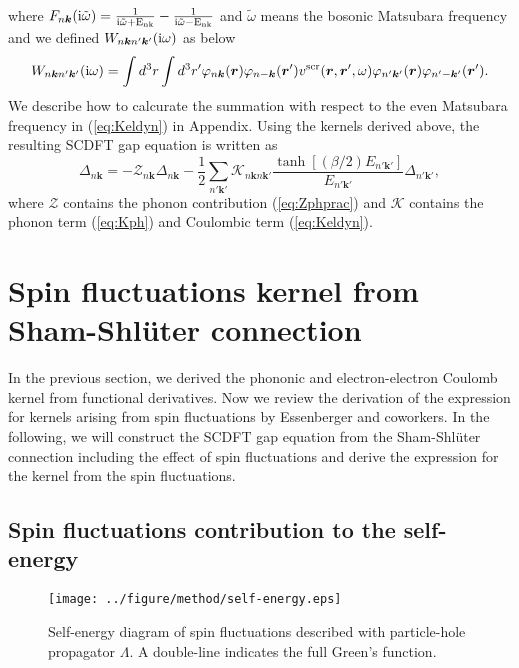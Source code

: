 %
where $F_{n\bm k}({\rm i}\tilde\omega) = 
\frac{1}{\rm i \tilde\omega + E_{n\bm k}}-\frac{1}{\rm i \tilde\omega - E_{n\bm k}}$
and $\tilde\omega$ means the bosonic Matsubara frequency and we defined 
$W_{n\bm kn'\bm k'}({\rm i}\omega)$ as below
%
\begin{equation}
	W_{n\bm kn'\bm k'}({\rm i}\omega) = 
	\int d^3r \int d^3r' \varphi_{n\bm k}(\bm r)\varphi_{n-\bm k}({\bm r'})
	v^{\rm scr}(\bm r, {\bm r'}, \omega) \varphi_{n'\bm k'}(\bm r) \varphi_{n'-\bm k'}({\bm r'}).
	\label{eq:dynWnknk}
\end{equation}
%
We describe how to calcurate the summation with respect to the even Matsubara frequency in (\ref{eq:Keldyn})
in Appendix.
Using the kernels derived above, the resulting SCDFT gap equation is written as
%
\begin{equation}
	\Delta_{n\bm k} = -{\mathcal Z}_{n \bm k}\Delta_{n\bm k} - \frac{1}{2}
	\sum_{n'\bm k'}{\mathcal K}_{n\bm k n \bm k'}
	\frac{\tanh[(\beta/2)E_{n' \bm k'}]}{E_{n' \bm k'}}\Delta_{n' \bm k'},
	\label{eq:truegapeq}
\end{equation}
%
where $\mathcal Z$ contains the phonon contribution (\ref{eq:Zphprac}) and $\mathcal K$ contains 
the phonon term (\ref{eq:Kph}) and Coulombic term (\ref{eq:Keldyn}).
\section{Spin fluctuations kernel from Sham-Shl\"{u}ter connection}
In the previous section, we derived the phononic and 
electron-electron Coulomb kernel from functional derivatives.
Now we review the derivation of the expression for kernels arising 
from spin fluctuations by Essenberger and coworkers\cite{Essenberger2014}.
In the following, we will construct the SCDFT gap equation from the Sham-Shl\"{u}ter connection
including the effect of spin fluctuations and derive the expression for the kernel from the spin fluctuations.

\subsection{Spin fluctuations contribution to the self-energy}

\begin{figure} %
	\centering
	\texttt{[image: ../figure/method/self-energy.eps]}
	\caption{Self-energy diagram of spin fluctuations described with particle-hole propagator $\Lambda$. A double-line indicates the full Green's function.}
	\label{fig:SF-self}
\end{figure}

